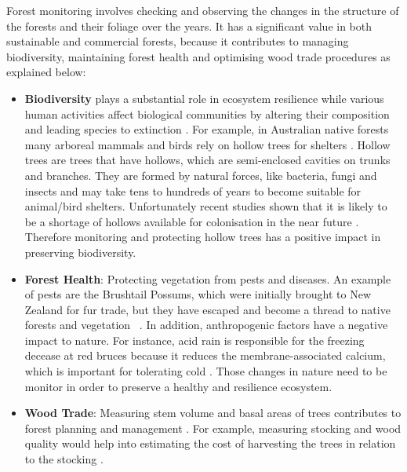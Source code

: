 \documentclass{subfiles}
\begin{document}
Forest monitoring {\color{blue} involves checking and observing the changes in the structure of the forests and their foliage over the years. It has a significant value in both sustainable and commercial forests, because it contributes} to managing biodiversity, maintaining forest health and optimising wood trade procedures as explained below: 
\begin{itemize}
 \item \textbf{Biodiversity} plays a substantial role in ecosystem resilience \cite{Elmqvist2003} while various human activities affect biological communities by altering their composition and leading species to extinction \cite{Hooper2005}.  For example, in Australian native forests many arboreal mammals and birds rely on hollow trees for shelters \cite{Lindenmayer2010} {\color{blue}. Hollow trees are trees that have hollows, which are semi-enclosed cavities on trunks and branches. They are formed by natural forces, like bacteria, fungi and insects and may take tens to hundreds of years to become suitable for animal/bird shelters. Unfortunately recent studies shown that it is likely to be a shortage of hollows available for colonisation in the near future \cite{Goldingay2009}\cite{Gibbons2002}}. Therefore monitoring and protecting hollow trees has a positive impact in preserving biodiversity.
 
 \item \textbf{Forest Health}: Protecting vegetation from pests and diseases. An example of pests are the Brushtail Possums, which were initially brought to New Zealand for fur trade, but they have escaped and become a thread to native forests and vegetation ~\cite{DepartementOfConversation2014}. In addition, anthropogenic factors have a negative impact to nature. For instance, acid rain is responsible for the freezing decease at red bruces because it reduces the membrane-associated calcium, which is important for tolerating cold 
 \cite{DeHayes1999}. Those changes in nature need to be monitor in order to preserve a healthy and resilience ecosystem. 
 
 \item \textbf{Wood Trade}:  Measuring stem volume and basal areas of trees contributes to forest planning and management \cite{Holmgren2004}. For example, measuring stocking and wood quality would help into estimating the cost of harvesting the trees in relation to the stocking \cite{Susana2015}.


\end{itemize}
 
\end{document}
